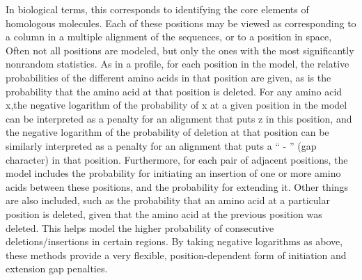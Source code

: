 In biological terms, this corresponds to identifying the core elements of homologous molecules.
Each of these positions may be viewed as corresponding to a column in a multiple alignment of the sequences, or to a position in space, Often not all positions are modeled, but only the ones with the most significantly nonrandom statistics.
As in a profile, for each position in the model, the relative probabilities of the different amino acids in that position are given, as is the probability that the amino acid at that position is deleted. For any amino acid x,the negative logarithm of the probability of x at a given position in the model can be interpreted as a penalty for an alignment that puts z in this position, and the negative logarithm of the probability of deletion at that position can be similarly interpreted as a penalty for an alignment that puts a “ - ” (gap character) in that position. Furthermore, for each pair of adjacent positions, the model includes the probability for initiating an insertion of one or more amino acids between these positions, and the probability for extending it.
Other things are also included, such as the probability that an amino acid at a particular position is deleted, given that the amino acid at the previous position was deleted. This helps model the higher probability of consecutive deletions/insertions in certain regions. By taking negative logarithms as above, these methods provide a very flexible, position-dependent form of initiation and extension gap penalties.

